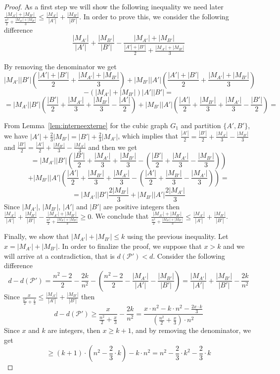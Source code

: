 \documentclass[a4paper,USenglish,cleveref, autoref]{lipics-v2021}
\begin{document}
\begin{proof}
As a first step we will show the following inequality we need later $\frac{|{M}_{A'}| + |{M}_{B'}|}{\frac{n^2}{2} + \frac{|{M}_{A'}| + |{M}_{B'}|}{3}} \leq \frac{|{M}_{A'}|}{|A'|} + \frac{|{M}_{B'}|}{|B'|}$. In order to prove this, we consider the following difference 
$$
    \frac{|{M}_{A'}|}{|A'|} + \frac{|{M}_{B'}|}{|B'|} - \frac{|{M}_{A'}|+|{M}_{B'}|}{\frac{|A'|+|B'|}{2} + \frac{|{M}_{A'}| + |{M}_{B'}|}{3}} 
$$

By removing the denominator we get 
$$
    |{M}_{A'}||B'|\left(\frac{|A'| + |B'|}{2} + \frac{|{M}_{A'}|+|{M}_{B'}|}{3}\right) + |{M}_{B'}||A'|\left(\frac{|A'| + |B'|}{2} + \frac{|{M}_{A'}|+|{M}_{B'}|}{3}\right) 
$$    
$$    
    - (|{M}_{A'}| + |{M}_{B'}|)|A'||B'| =
$$     
$$     
     = |{M}_{A'}||B'| \left(\frac{|B'|}{2} + \frac{|{M}_{A'}|}{3} + \frac{|{M}_{B'}|}{3} - \frac{|A'|}{2}\right) + |{M}_{B'}||A'|\left(\frac{|A'|}{2} + \frac{|{M}_{B'}|}{3} + \frac{|{M}_{A'}|}{3} - \frac{|B'|}{2}\right) =
$$

From Lemma~\ref{lem:interneexterne}  for the cubic graph $G_1$ and partition $\{A', B'\}$,  we have $|A'| + \frac{2}{3}|{M}_{B'}| = |B'| + \frac{2}{3}|{M}_{A'}|$, which implies that $\frac{|A'|}{2} = \frac{|B'|}{2} + \frac{|{M}_{A'}|}{3} - \frac{|{M}_{B'}|}{3}$ and $\frac{|B'|}{2} = \frac{|A'|}{2} + \frac{|{M}_{B'}|}{3} - \frac{|{M}_{A'}|}{3}$ and then we get 
$$
    = |{M}_{A'}||B'| \left(\frac{|B'|}{2} + \frac{|{M}_{A'}|}{3} + \frac{|{M}_{B'}|}{3} - \left(\frac{|B'|}{2} + \frac{|{M}_{A'}|}{3} - \frac{|{M}_{B'}|}{3}\right)\right)
$$    
$$    
     + |{M}_{B'}||A'|\left(\frac{|A'|}{2} + \frac{|{M}_{B'}|}{3} + \frac{|{M}_{A'}|}{3} - \left(\frac{|A'|}{2} + \frac{|{M}_{B'}|}{3} - \frac{|{M}_{A'}|}{3}\right)\right) =
$$
$$
    = |{M}_{A'}||B'|\frac{2|{M}_{B'}|}{3} + |{M}_{B'}||A'|\frac{2|{M}_{A'}|}{3}
$$
Since $|{M}_{A'}|$, $|{M}_{B'}|$, $|A'|$ and $|B'|$ are positive integers then  $\frac{|{M}_{A'}|}{|A'|} + \frac{|{M}_{B'}|}{|B'|} - \frac{|{M}_{A'}| + |{M}_{B'}|}{\frac{n^2}{2} + \frac{|{M}_{A'}| + |{M}_{B'}|}{3}} \geq 0$. We conclude that $\frac{|{M}_{A'}| + |{M}_{B'}|}{\frac{n^2}{2} + \frac{|{M}_{A'}| + |{M}_{B'}|}{3}} \leq \frac{|{M}_{A'}|}{|A'|} + \frac{|{M}_{B'}|}{|B'|}$.

\medskip


Finally, we  show that $|{M}_{A'}| + |{M}_{B'}| \leq k$ using the previous inequality. Let $x= |{M}_{A'}| + |{M}_{B'}|$. In order to finalize  the proof, we suppose that $x> k$ and we will arrive at a contradiction, that is   $d(\mathcal{P'}) < d$. Consider the following difference
$$
d - d(\mathcal{P'}) = \frac{n^2 - 2}{2} - \frac{2k}{n^2} - \left(\frac{n^2 - 2}{2} - \frac{|{M}_{A'}|}{|A'|} - \frac{|{M}_{B'}|}{|B'|}\right) = \frac{|{M}_{A'}|}{|A'|} + \frac{|{M}_{B'}|}{|B'|} - \frac{2k}{n^2}
$$
Since $\frac{x}{\frac{n^2}{2} + \frac{x}{3}} \leq \frac{|{M}_{A'}|}{|A'|} + \frac{|{M}_{B'}|}{|B'|}$ then
$$
d - d(\mathcal{P'}) \geq \frac{x}{\frac{n^2}{2}+\frac{x}{3}} - \frac{2k}{n^2} = \frac{x\cdot n^2 - k \cdot n^2 -\frac{2x\cdot k}{3}}{(\frac{n^2}{2}+\frac{x}{3}) \cdot n^2}
$$
Since $x$ and $k$ are integers, then $x\geq k+1$, and by removing the denominator, we get 
$$
    \geq (k+1) \cdot (n^2 - \frac{2}{3}\cdot k) - k\cdot n^2 = n^2 - \frac{2}{3}\cdot k^2 - \frac{2}{3}\cdot k
$$ 


\end{proof}
\end{document}
